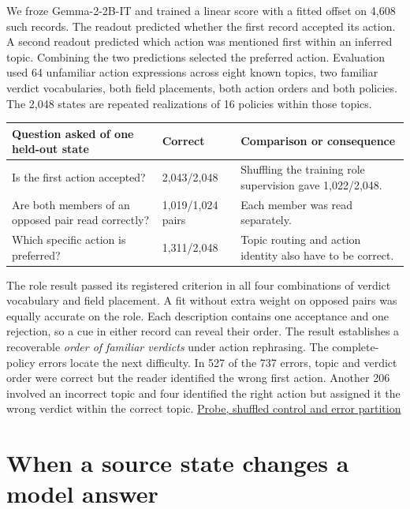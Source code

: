 \documentclass[11pt]{article}
\begin{document}
We froze Gemma-2-2B-IT and trained a linear score with a fitted offset on 4,608 such records. The readout predicted whether the first record accepted its action. A second readout predicted which action was mentioned first within an inferred topic. Combining the two predictions selected the preferred action. Evaluation used 64 unfamiliar action expressions across eight known topics, two familiar verdict vocabularies, both field placements, both action orders and both policies. The 2,048 states are repeated realizations of 16 policies within those topics.

\begin{center}
\small\renewcommand{\arraystretch}{1.15}
\begin{tabular}{@{}p{.35\linewidth}p{.17\linewidth}p{.40\linewidth}@{}}
\toprule
Question asked of one held-out state & Correct & Comparison or consequence \\
\midrule
Is the first action accepted? & 2,043/2,048 & Shuffling the training role supervision gave 1,022/2,048. \\
Are both members of an opposed pair read correctly? & 1,019/1,024 pairs & Each member was read separately. \\
Which specific action is preferred? & 1,311/2,048 & Topic routing and action identity also have to be correct. \\
\bottomrule
\end{tabular}
\end{center}

The role result passed its registered criterion in all four combinations of verdict vocabulary and field placement. A fit without extra weight on opposed pairs was equally accurate on the role. Each description contains one acceptance and one rejection, so a cue in either record can reveal their order. The result establishes a recoverable \emph{order of familiar verdicts} under action rephrasing. The complete-policy errors locate the next difficulty. In 527 of the 737 errors, topic and verdict order were correct but the reader identified the wrong first action. Another 206 involved an incorrect topic and four identified the right action but assigned it the wrong verdict within the correct topic. \href{https://github.com/RyoSpiralArchitect/self-fold/blob/v1.0.0/provenance/role_exchange_20261103/RESULTS.md}{Probe, shuffled control and error partition}

\section{When a source state changes a model answer}
\end{document}
